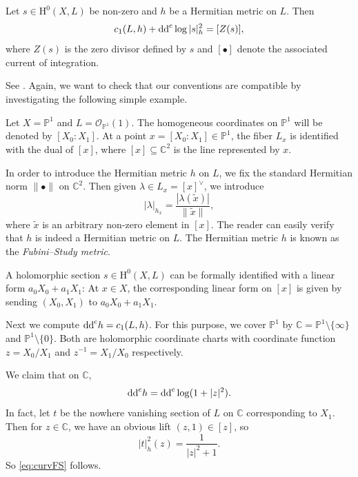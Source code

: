 \begin{proposition}\label{prop:LelongPoincare}
    Let $s\in \mathrm{H}^0(X,L)$ be non-zero and $h$ be a Hermitian metric on $L$. Then
    \begin{equation}\label{eq:LP}
        c_1(L,h)+\mathrm{dd}^{\mathrm{c}} \log|s|_h^2=[Z(s)],
    \end{equation}
    where $Z(s)$ is the zero divisor defined by $s$ and $[\bullet]$ denote the associated current of integration.
\end{proposition}
See \cite[(3.11)]{Dem12}. Again, we want to check that our conventions are compatible by investigating the following simple example.
\begin{example}\label{ex:LPP1}
    Let $X=\mathbb{P}^1$ and $L=\mathcal{O}_{\mathbb{P}^1}(1)$. The homogeneous coordinates on $\mathbb{P}^1$ will be denoted by $[X_0:X_1]$. At a point $x=[X_0:X_1]\in \mathbb{P}^1$, the fiber $L_x$ is identified with the dual of $[x]$, where $[x]\subseteq \mathbb{C}^2$ is the line represented by $x$.

    In order to introduce the Hermitian metric $h$ on $L$, we fix the standard Hermitian norm $\|\bullet\|$ on $\mathbb{C}^2$. Then given $\lambda\in L_x=[x]^{\vee}$, we introduce
    \[
    |\lambda|_{h_x}=\frac{|\lambda (\tilde{x})|}{\|\tilde{x}\|},
    \]
    where $\tilde{x}$ is an arbitrary non-zero element in $[x]$. The reader can easily verify that $h$ is indeed a Hermitian metric on $L$.
    The Hermitian metric $h$ is known as the \emph{Fubini--Study metric}.

    A holomorphic section $s\in \mathrm{H}^0(X,L)$ can be formally identified with a linear form $a_0X_0+a_1X_1$: At $x\in X$, the corresponding linear form on $[x]$ is given by sending $(X_0,X_1)$ to $a_0X_0+a_1X_1$.

    Next we compute $\mathrm{dd}^{\mathrm{c}} h=c_1(L,h)$. For this purpose, we cover $\mathbb{P}^1$ by $\mathbb{C}=\mathbb{P}^1\setminus \{\infty\}$ and $\mathbb{P}^1\setminus \{0\}$.
    Both are holomorphic coordinate charts with coordinate function $z=X_0/X_1$ and $z^{-1}=X_1/X_0$ respectively.

    We claim that on $\mathbb{C}$,
    \begin{equation}\label{eq:curvFS}
        \mathrm{dd}^{\mathrm{c}} h=\mathrm{dd}^{\mathrm{c}} \log (1+|z|^2).
    \end{equation}
    In fact, let $t$ be the nowhere vanishing section of $L$ on $\mathbb{C}$ corresponding to $X_1$. Then for $z\in \mathbb{C}$, we have an obvious lift $(z,1)\in [z]$, so
    \[
    |t|_h^2(z)=\frac{1}{|z|^2+1}.
    \]
    So \eqref{eq:curvFS} follows.


\end{example}
